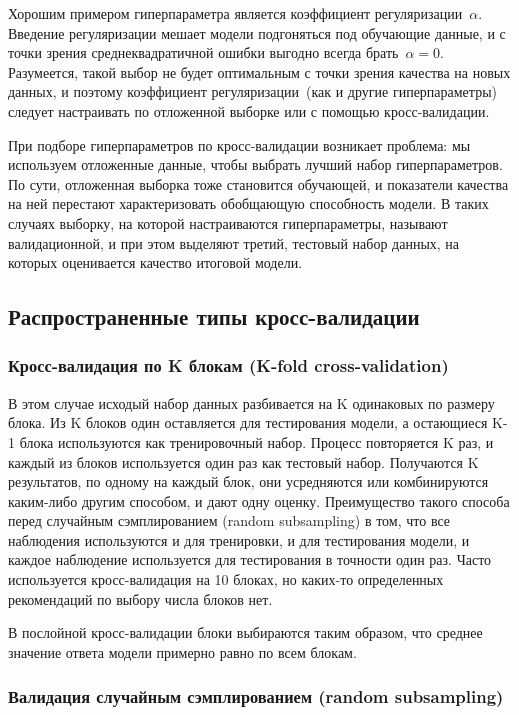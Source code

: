 \documentclass[a4paper, 12pt]{article}
\theoremstyle{plain} %
\theoremstyle{definition} %
\theoremstyle{remark} %
\begin{document}
	Хорошим примером гиперпараметра является коэффициент регуляризации~$\alpha$.
	Введение регуляризации мешает модели подгоняться под обучающие данные,
	и с точки зрения среднеквадратичной ошибки выгодно всегда брать~$\alpha = 0$.
	Разумеется, такой выбор не будет оптимальным с точки зрения качества на новых данных,
	и поэтому коэффициент регуляризации~(как и другие гиперпараметры) следует
	настраивать по отложенной выборке или с помощью кросс-валидации.

	При подборе гиперпараметров по кросс-валидации возникает проблема:
	мы используем отложенные данные, чтобы выбрать лучший набор гиперпараметров.
	По сути, отложенная выборка тоже становится обучающей, и показатели качества на ней
	перестают характеризовать обобщающую способность модели.
	В таких случаях выборку, на которой настраиваются гиперпараметры,
	называют валидационной, и при этом выделяют третий, тестовый набор данных,
	на которых оценивается качество итоговой модели.

\subsection{Распространенные типы кросс-валидации}

\subsubsection{Кросс-валидация по K блокам (K-fold cross-validation)}

В этом случае исходый набор данных разбивается на K одинаковых по размеру блока. Из K блоков один оставляется для тестирования модели, а остающиеся K-1 блока используются как тренировочный набор. Процесс повторяется K раз, и каждый из блоков используется один раз как тестовый набор. Получаются K результатов, по одному на каждый блок, они усредняются или комбинируются каким-либо другим способом, и дают одну оценку. Преимущество такого способа перед случайным сэмплированием (random subsampling) в том, что все наблюдения используются и для тренировки, и для тестирования модели, и каждое наблюдение используется для тестирования в точности один раз. Часто используется кросс-валидация на 10 блоках, но каких-то определенных рекомендаций по выбору числа блоков нет.

В послойной кросс-валидации блоки выбираются таким образом, что среднее значение ответа модели примерно равно по всем блокам.

\subsubsection{Валидация случайным сэмплированием (random subsampling)}
\end{document}
